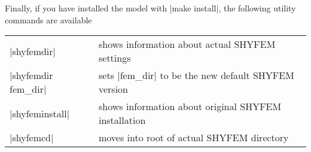 \vspace{0.5cm}
Finally, if you have installed the model with |make install|, 
the following utility commands are available \vspace{0.5cm}

\begin{center}
\begin{tabular}{ l l }
|shyfemdir|		&	shows information about actual SHYFEM
				settings \\
|shyfemdir fem_dir|	&	sets |fem_dir| to be the new default 
				SHYFEM version \\
|shyfeminstall|		&	shows information about original SHYFEM 
				installation \\
|shyfemcd|		&	moves into root of actual SHYFEM directory \\
\end{tabular}
\end{center}

